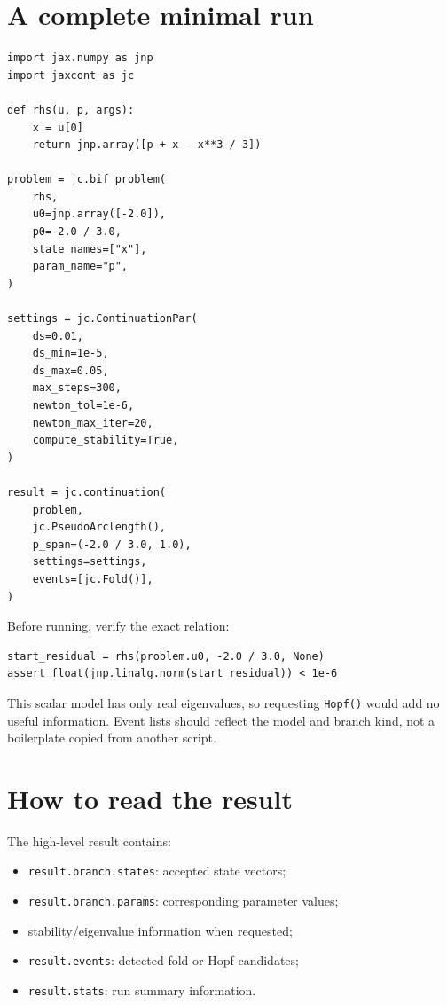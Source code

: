 \documentclass[11pt,oneside]{book}
\begin{document}
\section{A complete minimal run}

\begin{lstlisting}
import jax.numpy as jnp
import jaxcont as jc

def rhs(u, p, args):
    x = u[0]
    return jnp.array([p + x - x**3 / 3])

problem = jc.bif_problem(
    rhs,
    u0=jnp.array([-2.0]),
    p0=-2.0 / 3.0,
    state_names=["x"],
    param_name="p",
)

settings = jc.ContinuationPar(
    ds=0.01,
    ds_min=1e-5,
    ds_max=0.05,
    max_steps=300,
    newton_tol=1e-6,
    newton_max_iter=20,
    compute_stability=True,
)

result = jc.continuation(
    problem,
    jc.PseudoArclength(),
    p_span=(-2.0 / 3.0, 1.0),
    settings=settings,
    events=[jc.Fold()],
)
\end{lstlisting}

Before running, verify the exact relation:

\begin{lstlisting}
start_residual = rhs(problem.u0, -2.0 / 3.0, None)
assert float(jnp.linalg.norm(start_residual)) < 1e-6
\end{lstlisting}

This scalar model has only real eigenvalues, so requesting \texttt{Hopf()} would
add no useful information. Event lists should reflect the model and branch
kind, not a boilerplate copied from another script.

\section{How to read the result}

The high-level result contains:

\begin{itemize}
  \item \texttt{result.branch.states}: accepted state vectors;
  \item \texttt{result.branch.params}: corresponding parameter values;
  \item stability/eigenvalue information when requested;
  \item \texttt{result.events}: detected fold or Hopf candidates;
  \item \texttt{result.stats}: run summary information.
\end{itemize}
\end{document}
